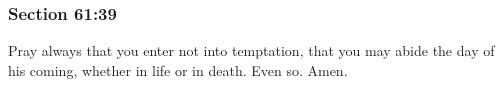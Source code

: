 	\subsubsection{Section 61:39} %
		\label{DC61-39}

		Pray always that you enter not into temptation, that you may abide the day of his coming, whether in life or in death.  Even so.  Amen.

